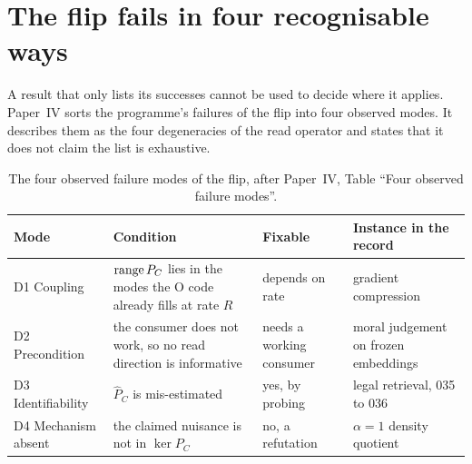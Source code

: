 

\section{The flip fails in four recognisable ways}\label{sec:ch06:fail}

A result that only lists its successes cannot be used to decide where it applies. Paper~IV sorts the programme's failures of the flip into four observed modes. It describes them as the four degeneracies of the read operator and states that it does not claim the list is exhaustive.

\begin{table}[ht]\small\centering
\begin{tabular}{@{}p{2.6cm}p{4.6cm}p{2.4cm}p{3.3cm}@{}}
\toprule
Mode & Condition & Fixable & Instance in the record \\
\midrule
D1 Coupling & $\operatorname{range} P_C$ lies in the modes the O code already fills at rate $R$ & depends on rate & gradient compression \\
D2 Precondition & the consumer does not work, so no read direction is informative & needs a working consumer & moral judgement on frozen embeddings \\
D3 Identifiability & $\hat P_C$ is mis-estimated & yes, by probing & legal retrieval, 035 to 036 \\
D4 Mechanism absent & the claimed nuisance is not in $\ker P_C$ & no, a refutation & $\alpha=1$ density quotient \\
\bottomrule
\end{tabular}
\caption{The four observed failure modes of the flip, after Paper~IV, Table ``Four observed failure modes''.}
\label{tab:ch06:modes}
\end{table}

